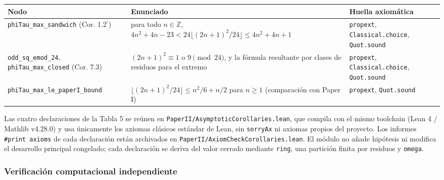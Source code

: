 \documentclass[
  spanish,
  11pt,
  a4paper,
]{article}
\newcounter{none} %
\begin{document}
{\def\LTcaptype{none} %
\begin{longtable}[]{@{}
  >{\raggedright\arraybackslash}p{}
  >{\raggedright\arraybackslash}p{}
  >{\raggedright\arraybackslash}p{}@{}}
\toprule\noalign{}
\begin{minipage}[b]{\linewidth}\raggedright
Nodo
\end{minipage} & \begin{minipage}[b]{\linewidth}\raggedright
Enunciado
\end{minipage} & \begin{minipage}[b]{\linewidth}\raggedright
Huella axiomática
\end{minipage} \\
\midrule\noalign{}
\endhead
\bottomrule\noalign{}
\endlastfoot
\texttt{phiTau\_max\_sandwich} (Cor. 1.2\(^{\prime}\)) & para todo \(n\in\mathbb Z\), \(4n^2+4n-23<24\lfloor(2n+1)^2/24\rfloor\le4n^2+4n+1\) & \texttt{propext}, \texttt{Classical.choice}, \texttt{Quot.sound} \\
\texttt{odd\_sq\_emod\_24}, \texttt{phiTau\_max\_closed} (Cor. 7.3) & \((2n+1)^2\equiv1\) o \(9\pmod{24}\), y la fórmula resultante por clases de residuos para el extremo & \texttt{propext}, \texttt{Classical.choice}, \texttt{Quot.sound} \\
\texttt{phiTau\_max\_le\_paperI\_bound} & \(\lfloor(2n+1)^2/24\rfloor\le n^2/6+n/2\) para \(n\ge1\) (comparación con Paper I) & \texttt{propext}, \texttt{Quot.sound} \\
\end{longtable}
}

Las cuatro declaraciones de la Tabla 5 se reúnen en \texttt{PaperII/AsymptoticCorollaries.lean}, que compila con el mismo toolchain (Lean 4 / Mathlib v4.28.0) y usa únicamente los axiomas clásicos estándar de Lean, sin \texttt{sorryAx} ni axiomas propios del proyecto. Los informes \texttt{\#print\ axioms} de cada declaración están archivados en \texttt{PaperII/AxiomCheckCorollaries.lean}. El módulo no añade hipótesis ni modifica el desarrollo principal congelado; cada declaración se deriva del valor cerrado mediante \texttt{ring}, una partición finita por residuos y \texttt{omega}.

\subsubsection{Verificación computacional independiente}\label{verificaciuxf3n-computacional-independiente}
\end{document}
